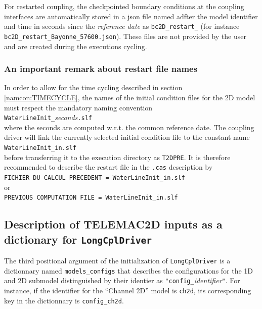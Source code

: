 For restarted coupling, the checkpointed boundary conditions at the
coupling interfaces are automatically stored in a json file named adfter the model
identifier and time in seconds since the {\em reference
  date} as \texttt{bc2D\_restart\_} (for instance \texttt{bc2D\_restart\_Bayonne\_57600.json}). These files are not provided by the user and are created during the executions cycling.

\subsubsection{An important remark about restart file names}
In order to allow for the time cycling described in section
\ref{namcon:TIMECYCLE}, the names of the initial condition files for
the 2D model must respect the mandatory naming convention\\
\texttt{WaterLineInit\_}{\em seconds}\texttt{.slf}\\
where the seconds are computed w.r.t. the common reference date.
The coupling driver will link the currently selected initial condition
file to the constant name\\
\texttt{WaterLineInit\_in.slf}\\
before transferring it to the execution directory as
\texttt{T2DPRE}. It is therefore recommended to describe the restart
file in the \texttt{.cas} description by\\
\texttt{FICHIER DU CALCUL PRECEDENT = WaterLineInit\_in.slf}\\
or\\
\texttt{PREVIOUS COMPUTATION FILE = WaterLineInit\_in.slf}

\subsection{Description of TELEMAC2D inputs as a dictionary for \texttt{LongCplDriver}}
The third positional argument of the initialization of
\texttt{LongCplDriver} is a dictionnary named \texttt{models\_configs} that describes the configurations for the 1D and 2D submodel distinguished by their identier as \texttt{"config\_}{\em identifier}\texttt{"}. For instance, if the identifier for the ``Channel 2D'' model is
\texttt{ch2d}, its corresponding key in the dictionnary is \texttt{config\_ch2d}.
\newline

